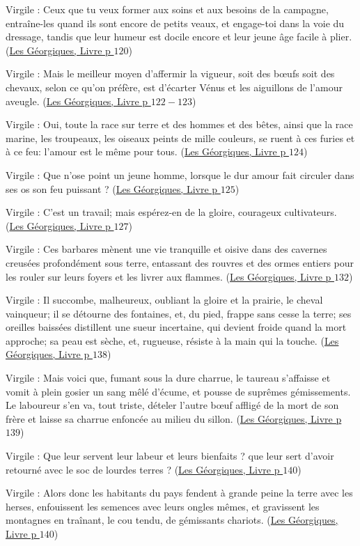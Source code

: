 \documentclass[a4paper, 11pt, hidelinks]{article}
\newcommand{\bs}{\bigskip}
\newcommand{\rb}[1]{\Romanbar{#1}}
\newcommand{\citer}[3]{\bs \begin{center} \textcolor{authorGray}{#1 :} \textcolor{citationRed}{\og #2 \fg} \textcolor{authorGray}{(\underline{#3})} \end{center} \bs}
\begin{document}
\citer{Virgile}{Ceux que tu veux former aux soins et aux besoins de la campagne, entraîne-les quand ils sont encore de petits veaux,
et engage-toi dans la voie du dressage, tandis que leur humeur est docile encore et leur jeune âge facile à plier.}{Les Géorgiques, Livre \rb{3} p $120$}


\citer{Virgile}{Mais le meilleur moyen d'affermir la vigueur, soit des b\oe ufs soit des chevaux, selon ce qu'on préfère, est d'écarter 
Vénus et les aiguillons de l'amour aveugle.}{Les Géorgiques, Livre \rb{3} p $122-123$}


\citer{Virgile}{Oui, toute la race sur terre et des hommes et des bêtes, ainsi que la race marine, les troupeaux, 
les oiseaux peints de mille couleurs, se ruent à ces furies et à ce feu: l'amour est le même pour tous.}{Les Géorgiques, Livre \rb{3} p $124$}


\citer{Virgile}{Que n'ose point un jeune homme, lorsque le dur amour fait circuler dans ses os son feu puissant ?}{Les Géorgiques, Livre \rb{3} p $125$}


\citer{Virgile}{C'est un travail; mais espérez-en de la gloire, courageux cultivateurs.}{Les Géorgiques, Livre \rb{3} p $127$}


\citer{Virgile}{Ces barbares mènent une vie tranquille et oisive dans des cavernes creusées profondément sous terre, entassant 
des rouvres et des ormes entiers pour les rouler sur leurs foyers et les livrer aux flammes.}{Les Géorgiques, Livre \rb{3} p $132$}


\citer{Virgile}{Il succombe, malheureux, oubliant la gloire et la prairie, le cheval vainqueur; il se détourne des fontaines, et,
du pied, frappe sans cesse la terre; ses oreilles baissées distillent une sueur incertaine, qui devient froide quand la mort
approche; sa peau est sèche, et, rugueuse, résiste à la main qui la touche.}{Les Géorgiques, Livre \rb{3} p $138$}


\citer{Virgile}{Mais voici que, fumant sous la dure charrue, le taureau s'affaisse et vomit à plein gosier un sang mêlé d'écume, et 
pousse de suprêmes gémissements. Le laboureur s'en va, tout triste, dételer l'autre b\oe uf affligé de la mort de son frère et laisse 
sa charrue enfoncée au milieu du sillon.}{Les Géorgiques, Livre \rb{3} p $139$}


\citer{Virgile}{Que leur servent leur labeur et leurs bienfaits ? que leur sert d'avoir retourné avec le soc de lourdes terres ?}{Les Géorgiques, Livre \rb{3} p $140$}


\citer{Virgile}{Alors donc les habitants du pays fendent à grande peine la terre avec les herses, enfouissent les semences avec leurs 
ongles mêmes, et gravissent les montagnes en traînant, le cou tendu, de gémissants chariots.}{Les Géorgiques, Livre \rb{3} p $140$}
\end{document}
